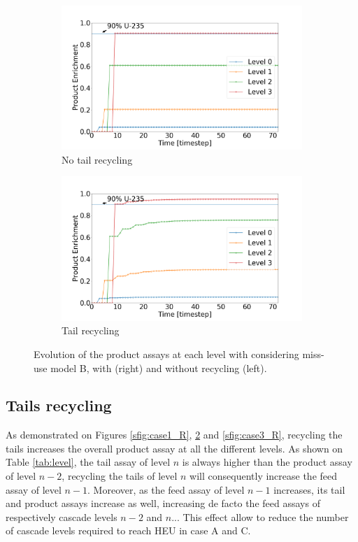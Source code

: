 \begin{figure}[h!]
    \centering
    \begin{subfigure}[t]{0.45\textwidth}
        \centering
        \includegraphics[scale=0.18]{NR_case2}
        \caption{No tail recycling}
        \label{sfig:case2_NR}
    \end{subfigure}%
    \begin{subfigure}[t]{0.45\textwidth}
        \centering
        \includegraphics[scale=0.18]{R_case2}
        \caption{Tail recycling}
        \label{sfig:case2_R}
    \end{subfigure}
    \caption{Evolution of the product assays at each level with considering
    miss-use model B, with (right) and without recycling (left).}
    \label{fig:case2}
\end{figure}

\subsection{Tails recycling}
As demonstrated on Figures \ref{sfig:case1_R}, \ref{sfig:case2_R} and
\ref{sfig:case3_R}, recycling the tails increases the overall product assay at all
the different levels. As shown on Table \ref{tab:level}, the tail assay of level
$n$ is always higher than the product assay of level $n-2$, recycling the tails
of level $n$ will consequently increase the feed assay of level $n-1$. Moreover,
as the feed assay of level $n-1$ increases, its tail and product assays increase as well,
increasing de facto the feed assays of respectively cascade levels $n-2$ and $n$...
This effect allow to reduce the number of cascade levels required to reach
\gls{HEU} in case A and C.

